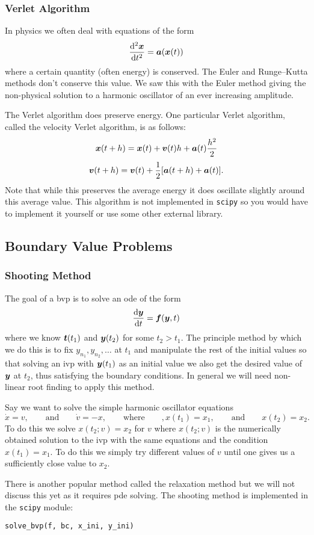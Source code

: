 \documentclass[a4paper]{article}
\begin{document}
    \subsubsection{Verlet Algorithm}
    In physics we often deal with equations of the form
    \[\dv[2]{\bm{x}}{t} = \bm{a}(\bm{x}(t))\]
    where a certain quantity (often energy) is conserved.
    The Euler and Runge--Kutta methods don't conserve this value.
    We saw this with the Euler method giving the non-physical solution to a harmonic oscillator of an ever increasing amplitude.
    
    The Verlet algorithm does preserve energy.
    One particular Verlet algorithm, called the velocity Verlet algorithm, is as follows:
    \[\bm{x}(t + h) = \bm{x}(t) + \bm{v}(t)h + \bm{a}(t)\frac{h^2}{2}\]
    \[\bm{v}(t + h) = \bm{v}(t) + \frac{1}{2}[\bm{a}(t + h) + \bm{a}(t)].\]
    Note that while this preserves the average energy it does oscillate slightly around this average value.
    This algorithm is not implemented in \lstinline[language=python]|scipy| so you would have to implement it yourself or use some other external library.
    
    \subsection{Boundary Value Problems}
    \subsubsection{Shooting Method}
    The goal of a \gls{bvp} is to solve an \gls{ode} of the form
    \[\dv{\bm{y}}{t} = \bm{f}(\bm{y}, t)\]
    where we know \(\bm{t}(t_1)\) and \(\bm{y}(t_2)\) for some \(t_2 > t_1\).
    The principle method by which we do this is to fix \(y_{n_1}, y_{n_2}, \dotsc\) at \(t_1\) and manipulate the rest of the initial values so that solving an \gls{ivp} with \(\bm{y}(t_1)\) as an initial value we also get the desired value of \(\bm{y}\) at \(t_2\), thus satisfying the boundary conditions.
    In general we will need non-linear root finding to apply this method.
    
    \begin{example}
        Say we want to solve the simple harmonic oscillator equations
        \[\dot{x} = v, \qquad\text{and}\qquad \dot{v} = -x, \qquad\text{where}\qquad, x(t_1) = x_1, \qquad\text{and}\qquad x(t_2) = x_2.\]
        To do this we solve \(x(t_2; v) = x_2\) for \(v\) where \(x(t_2; v)\) is the numerically obtained solution to the \gls{ivp} with the same equations and the condition \(x(t_1) = x_1\).
        To do this we simply try different values of \(v\) until one gives us a sufficiently close value to \(x_2\).
    \end{example}
    There is another popular method called the relaxation method but we will not discuss this yet as it requires \gls{pde} solving.
    The shooting method is implemented in the \lstinline[language=python]|scipy| module:
    \begin{lstlisting}[language=python]
    solve_bvp(f, bc, x_ini, y_ini)
    \end{lstlisting}
    
\end{document}
